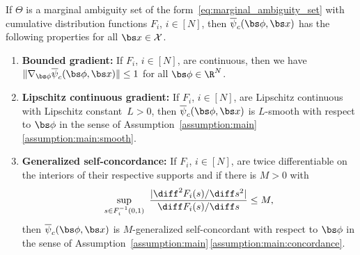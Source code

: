 \documentclass[11pt, a4paper, oneside, reqno]{article}
\begin{document}
	\begin{proposition}
		\label{proposition:structural}
		If $\Theta$ is a marginal ambiguity set of the form~\eqref{eq:marginal_ambiguity_set} with cumulative distribution functions $F_i$, $i\in[N]$, then $\overline\psi_c(\bs \phi, \bs x)$ has the following properties for all $\bs x \in \mathcal X$.
		\begin{enumerate} [label=(\roman*)]
			\item \textbf{Bounded gradient:} \label{proposition:gradient} If $F_i$, $i\in[N]$, are continuous, then we have $ \| \nabla_{\bs \phi} \overline\psi_c(\bs \phi, \bs x) \| \leq 1 $ for all $\bs \phi\in\R^N$.
			\item \textbf{Lipschitz continuous gradient:} \label{proposition:smooth} If $F_i$, $i\in[N]$, are Lipschitz continuous with Lipschitz constant~$L>0$, then $\overline\psi_c(\bs \phi, \bs x)$ is $L$-smooth with respect to $\bs \phi$ in the sense of Assumption~\ref{assumption:main}\,\ref{assumption:main:smooth}.
			\item \textbf{Generalized self-concordance:} \label{proposition:concordance} If $F_i$, $i\in[N]$, are twice differentiable on the interiors of their respective supports and if there is $M > 0$ with
			\begin{equation}
			    \label{eq:cumulative:concoradance}
			    \sup_{s \in F_i^{-1}(0,1)} ~ \frac{|\diff^2F_i(s) / \diff s^2|}{\diff F_i(s) / \diff s} \leq M,
			\end{equation}
			then $\overline\psi_c(\bs \phi, \bs x)$ is $M$-generalized self-concordant with respect to $\bs \phi$ in the sense of Assumption~\ref{assumption:main}\,\ref{assumption:main:concordance}.
		\end{enumerate}
	\end{proposition}
\end{document}
